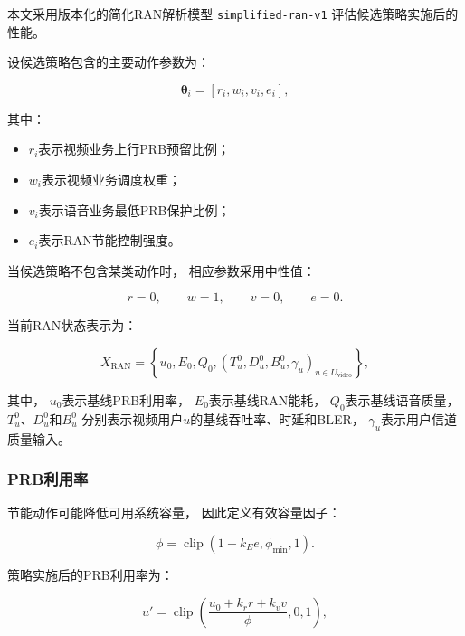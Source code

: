\documentclass[lang=cn,12pt]{elegantbook}
\begin{document}
本文采用版本化的简化RAN解析模型
\texttt{simplified-ran-v1}
评估候选策略实施后的性能。

设候选策略包含的主要动作参数为：

\begin{equation}
\boldsymbol{\theta}_i
=
\left[
r_i,
w_i,
v_i,
e_i
\right],
\label{eq:policy_parameter_vector_reduced}
\end{equation}

其中：

\begin{itemize}
    \item $r_i$表示视频业务上行PRB预留比例；
    \item $w_i$表示视频业务调度权重；
    \item $v_i$表示语音业务最低PRB保护比例；
    \item $e_i$表示RAN节能控制强度。
\end{itemize}

当候选策略不包含某类动作时，
相应参数采用中性值：

\begin{equation}
r=0,
\qquad
w=1,
\qquad
v=0,
\qquad
e=0.
\label{eq:neutral_policy_parameters_reduced}
\end{equation}

当前RAN状态表示为：

\begin{equation}
X_{\mathrm{RAN}}
=
\left\{
u_0,
E_0,
Q_0,
\left(
T_u^0,
D_u^0,
B_u^0,
\gamma_u
\right)_{u\in U_{\mathrm{video}}}
\right\},
\label{eq:ran_state_reduced}
\end{equation}

其中，
$u_0$表示基线PRB利用率，
$E_0$表示基线RAN能耗，
$Q_0$表示基线语音质量，
$T_u^0$、$D_u^0$和$B_u^0$
分别表示视频用户$u$的基线吞吐率、时延和BLER，
$\gamma_u$表示用户信道质量输入。


\subsubsection*{PRB利用率}

节能动作可能降低可用系统容量，
因此定义有效容量因子：

\begin{equation}
\phi
=
\operatorname{clip}
\left(
1-k_Ee,
\phi_{\min},
1
\right).
\label{eq:effective_capacity_reduced}
\end{equation}

策略实施后的PRB利用率为：

\begin{equation}
u'
=
\operatorname{clip}
\left(
\frac{
u_0+k_rr+k_vv
}{
\phi
},
0,
1
\right),
\label{eq:post_policy_prb_reduced}
\end{equation}
\end{document}
